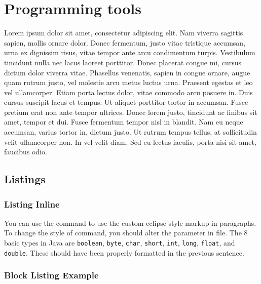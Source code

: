 \chapter{Programming tools}

Lorem ipsum dolor sit amet, consectetur adipiscing elit. Nam viverra sagittis sapien, mollis ornare dolor. Donec fermentum, justo vitae tristique accumsan, urna ex dignissim risus, vitae tempor ante arcu condimentum turpis. Vestibulum tincidunt nulla nec lacus laoreet porttitor. Donec placerat congue mi, cursus dictum dolor viverra vitae. Phasellus venenatis, sapien in congue ornare, augue quam rutrum justo, vel molestie arcu metus luctus urna. Praesent egestas et leo vel ullamcorper. Etiam porta lectus dolor, vitae commodo arcu posuere in. Duis cursus suscipit lacus et tempus. Ut aliquet porttitor tortor in accumsan. Fusce pretium erat non ante tempor ultrices. Donec lorem justo, tincidunt ac finibus sit amet, tempor et dui. Fusce fermentum tempor nisl in blandit. Nam eu neque accumsan, varius tortor in, dictum justo. Ut rutrum tempus tellus, at sollicitudin velit ullamcorper non. In vel velit diam. Sed eu lectus iaculis, porta nisi sit amet, faucibus odio.

\section{Listings}


	\subsection*{Listing Inline}
	
	\lstset{breaklines=false}
	
	You can use the  command to use the custom
	eclipse style markup in paragraphs. To change the style of  command, you should alter the parameter  in  file.  The 8 basic types in Java are
	\lstinline$boolean$, \lstinline$byte$, \lstinline$char$,
	\lstinline$short$, \lstinline$int$, \lstinline$long$,
	\lstinline$float$, and \lstinline$double$. These should have been
	properly formatted in the previous sentence.
	
	\lstset{breaklines=true}
	
	\subsection*{Block Listing Example}
	
